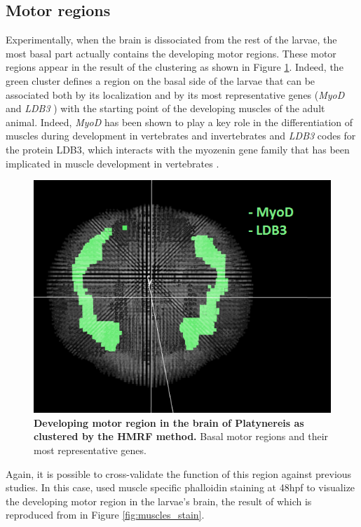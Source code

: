 		\subsection{Motor regions}
		Experimentally, when the brain is dissociated from the rest of the larvae, the most basal part actually contains the developing motor regions. These motor regions appear in the result of the clustering as shown in Figure \ref{fig:muscles}. Indeed, the green cluster defines a region on the basal side of the larvae that can be associated both by its localization and by its most representative genes ({\it{MyoD}} \cite{weintraub91,michelson90} and {\it{LDB3}} \cite{krcmery10,marziliano07}) with the starting point of the developing muscles of the adult animal. Indeed, {\it{MyoD}} has been shown to play a key role in the differentiation of muscles during development in vertebrates and invertebrates \cite{weintraub91,michelson90} and {\it{LDB3}} codes for the protein LDB3, which interacts with the myozenin gene family that has been implicated in muscle development in vertebrates \cite{marziliano07}.\\
		
	\begin{figure}[h]
\centerline{\includegraphics[width=0.8\linewidth]{gfx/chapter6/muscles.png}}
\caption{{\bf Developing motor region in the brain of Platynereis as clustered by the HMRF method.} Basal motor regions and their most representative genes.}
\label{fig:muscles}
	\end{figure}
		
		Again, it is possible to cross-validate the function of this region against previous studies. In this case, \cite{Fischer10} used muscle specific phalloidin staining at 48hpf to visualize the developing motor region in the larvae's brain, the result of which is reproduced from \cite{Fischer10} in Figure \ref{fig:muscles_stain}. 
		
